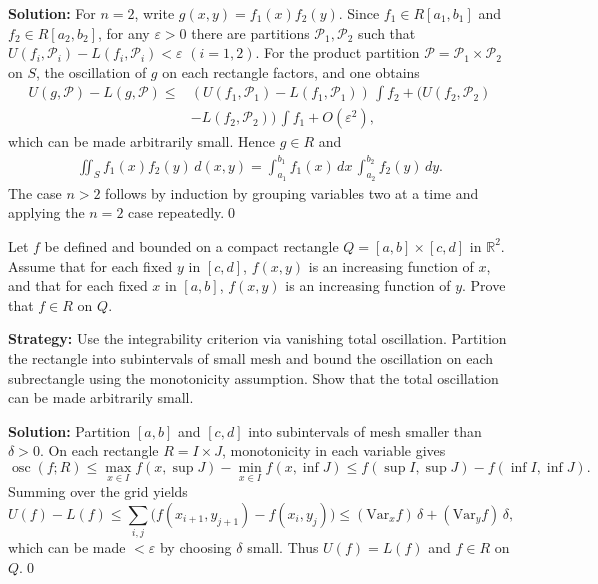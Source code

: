 \bigskip\noindent\textbf{Solution:}
For $n=2$, write $g(x,y)=f_1(x)f_2(y)$. Since $f_1\in R[a_1,b_1]$ and $f_2\in R[a_2,b_2]$, for any $\varepsilon>0$ there are partitions $\mathcal P_1,\mathcal P_2$ such that $U(f_i,\mathcal P_i)-L(f_i,\mathcal P_i)<\varepsilon$ $(i=1,2)$. For the product partition $\mathcal P=\mathcal P_1\times\mathcal P_2$ on $S$, the oscillation of $g$ on each rectangle factors, and one obtains
\begin{align*}
 U(g,\mathcal P)-L(g,\mathcal P) \le & (U(f_1,\mathcal P_1)-L(f_1,\mathcal P_1))\,\int f_2 + (U(f_2,\mathcal P_2) \\
 &-L(f_2,\mathcal P_2))\,\int f_1 + O(\varepsilon^2), 
\end{align*}
which can be made arbitrarily small. Hence $g\in R$ and
\begin{align*}
 \iint_S f_1(x)f_2(y)\,d(x,y) = \int_{a_1}^{b_1} f_1(x)\,dx\,\int_{a_2}^{b_2} f_2(y)\,dy. 
\end{align*}
The case $n>2$ follows by induction by grouping variables two at a time and applying the $n=2$ case repeatedly.\qed


\begin{problembox}
Let \( f \) be defined and bounded on a compact rectangle \( Q = [a, b] \times [c, d] \) in \( \mathbb{R}^2 \). Assume that for each fixed \( y \) in \([c, d]\), \( f(x, y) \) is an increasing function of \( x \), and that for each fixed \( x \) in \([a, b]\), \( f(x, y) \) is an increasing function of \( y \). Prove that \( f \in R \) on \( Q \).
\end{problembox}

\noindent\textbf{Strategy:} Use the integrability criterion via vanishing total oscillation. Partition the rectangle into subintervals of small mesh and bound the oscillation on each subrectangle using the monotonicity assumption. Show that the total oscillation can be made arbitrarily small.

\bigskip\noindent\textbf{Solution:}
Partition $[a,b]$ and $[c,d]$ into subintervals of mesh smaller than $\delta>0$. On each rectangle $R=I\times J$, monotonicity in each variable gives
\[ \operatorname{osc}(f;R) \le \max_{x\in I}\!f(x,\sup J)-\min_{x\in I}\!f(x,\inf J) \le f(\sup I,\sup J)-f(\inf I,\inf J). \]
Summing over the grid yields
\[ U(f)-L(f) \le \sum_{i,j} \big(f(x_{i+1},y_{j+1})-f(x_i,y_j)\big) \le (\text{Var}_x f)\,\delta + (\text{Var}_y f)\,\delta, \]
which can be made $<\varepsilon$ by choosing $\delta$ small. Thus $U(f)=L(f)$ and $f\in R$ on $Q$.\qed


